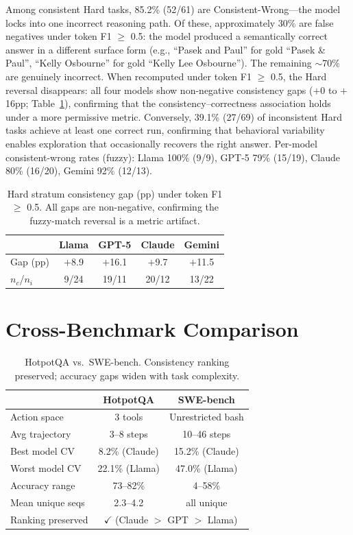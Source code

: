 \documentclass{article}
\begin{document}
Among consistent Hard tasks, 85.2\% (52/61) are Consistent-Wrong---the model locks into one incorrect reasoning path. Of these, approximately 30\% are false negatives under token F1 $\geq$ 0.5: the model produced a semantically correct answer in a different surface form (e.g., ``Pasek and Paul'' for gold ``Pasek \& Paul'', ``Kelly Osbourne'' for gold ``Kelly Lee Osbourne''). The remaining $\sim$70\% are genuinely incorrect. When recomputed under token F1 $\geq$ 0.5, the Hard reversal disappears: all four models show non-negative consistency gaps ($+$0 to $+$16pp; Table~\ref{tab:f1_hard}), confirming that the consistency--correctness association holds under a more permissive metric. Conversely, 39.1\% (27/69) of inconsistent Hard tasks achieve at least one correct run, confirming that behavioral variability enables exploration that occasionally recovers the right answer. Per-model consistent-wrong rates (fuzzy): Llama 100\% (9/9), GPT-5 79\% (15/19), Claude 80\% (16/20), Gemini 92\% (12/13).

\begin{table}[h]
\centering
\small
\caption{Hard stratum consistency gap (pp) under token F1 $\geq$ 0.5. All gaps are non-negative, confirming the fuzzy-match reversal is a metric artifact.}
\label{tab:f1_hard}
\scriptsize
\begin{tabular}{lcccc}
\toprule
& \textbf{Llama} & \textbf{GPT-5} & \textbf{Claude} & \textbf{Gemini} \\
\midrule
Gap (pp) & $+$8.9 & $+$16.1 & $+$9.7 & $+$11.5 \\
$n_c$/$n_i$ & 9/24 & 19/11 & 20/12 & 13/22 \\
\bottomrule
\end{tabular}
\end{table}

\section{Cross-Benchmark Comparison}
\label{app:swebench}

\begin{table}[h]
\centering
\small
\caption{HotpotQA vs.\ SWE-bench. Consistency ranking preserved; accuracy gaps widen with task complexity.}
\begin{tabular}{lcc}
\toprule
& \textbf{HotpotQA} & \textbf{SWE-bench} \\
\midrule
Action space & 3 tools & Unrestricted bash \\
Avg trajectory & 3--8 steps & 10--46 steps \\
Best model CV & 8.2\% (Claude) & 15.2\% (Claude) \\
Worst model CV & 22.1\% (Llama) & 47.0\% (Llama) \\
Accuracy range & 73--82\% & 4--58\% \\
Mean unique seqs & 2.3--4.2 & all unique \\
Ranking preserved & \multicolumn{2}{c}{$\checkmark$ (Claude $>$ GPT $>$ Llama)} \\
\bottomrule
\end{tabular}
\end{table}
\end{document}
